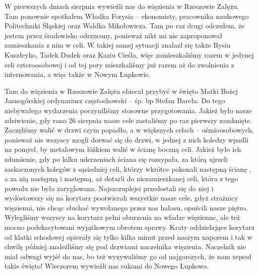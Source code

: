 W pierwszych dniach sierpnia wywieźli nas do więzienia w Rzeszowie Załężu. Tam ponownie spotkałem Włodka Forysia – ekonomisty, pracownika naukowego Politechniki Śląskiej oraz Waldka Mikołowicza. Tam po raz drugi odczułem, że jestem przez środowisko odrzucony, ponieważ nikt mi nie zaproponował zamieszkania z nim w celi. W takiej samej sytuacji znalazł się także Rysiu Kuszłeyko, Tadek Dudek oraz Kaziu Cieśla, więc zamieszkaliśmy razem w jedynej celi czteroosobowej i od tej pory mieszkaliśmy już razem aż do zwolnienia z internowania, a więc także w Nowym Łupkowie.

Tam do więzienia w Rzeszowie Załężu obiecał przybyć w święto Matki Bożej Jasnogórskiej ordynariusz częstochowski – śp. bp Stefan Bareła. Do tego niebywałego wydarzenia poczyniliśmy stosowne przygotowania. Jakież było nasze zdziwienie, gdy rano 26 sierpnia nasze cele zastaliśmy po raz pierwszy zamknięte. Zaczęliśmy walić w drzwi czym popadło, a w większych celach – ośmioosobowych, ponieważ nie wszyscy mogli dorwać się do drzwi, w jednej z nich koledzy wpadli na pomysł, by metalowym łóżkiem walić w ścianę boczną celi. Jakież było ich zdumienie, gdy po kilku uderzeniach ściana się rozsypała, za którą ujrzeli zaskoczonych kolegów z sąsiedniej celi, którzy wkrótce pokonali następną ścianę , a za nią następną i następną, aż dotarli do niezamieszkanej celi, która z tego powodu nie była zaryglowana. Najszczuplejsi przedostali się do niej i wydostawszy się na korytarz pootwierali wszystkie nasze cele, gdyż strażnicy więzienni, nie chcąc słuchać wywołanego przez nas hałasu, opuścili nasze piętro. Wylegliśmy wszyscy na korytarz pełni oburzenia na władze więzienne, ale też mocno podekscytowani wyjątkowym obrotem sprawy. Kraty oddzielające korytarz od klatki schodowej opierały się tylko kilka minut przed naszym naporem i tak w chwilę później znaleźliśmy się pod drzwiami naczelnika więzienia. Naczelnik nie miał odwagi wyjść do nas, bo też wyzywaliśmy go od najgorszych, że nam zepsuł takie święto! Wieczorem wywieźli nas sukami do Nowego Łupkowa.

